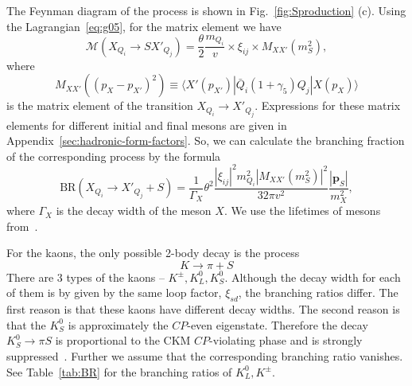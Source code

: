 \documentclass[a4paper,12pt,dvipsnames,usernames]{article}
\begin{document}
The Feynman diagram of the process is shown in Fig.~\ref{fig:Sproduction} (c). Using the Lagrangian~\eqref{eq:g05}, for the matrix element we have
\begin{equation}
    \mathcal{M} (X_{Q_{i}} \to S X'_{Q_{j}}) =
\frac{\theta}{2}\frac{m_{Q_{i}}}{v}\times  \xi_{ij}\times M_{XX'}(m_{S}^{2}),
    \label{eq:matrixelementhhS}
\end{equation} 
where
\begin{equation}
    M_{XX'}((p_{X}-p_{X'})^{2}) \equiv \langle X'(p_{X'})|\bar{Q}_{i}(1+\gamma_{5})Q_{j}|X(p_{X})\rangle
    \label{eq:hadronic-matrix-element-1}
\end{equation}
is the matrix element of the transition $X_{Q_{i}}\to X'_{Q_{j}}$. Expressions for these matrix elements for different initial and final mesons are given in Appendix~\ref{sec:hadronic-form-factors}. So, we can calculate the branching fraction of the corresponding process by the formula ~\cite{Tanabashi:2018oca}
\begin{equation}
    \text{BR}(X_{Q_{i}}\to X'_{Q_{j}}+S) = \frac{1}{\Gamma_{X}}\theta^{2}\frac{|\xi_{ij}|^{2}m_{Q_{i}}^{2}|M_{XX'}(m_{S}^{2})|^{2}}{32\pi v^{2}}\frac{|\bm{p}_{S}|}{m_{X}^{2}},
    \label{eq:productionBRmesons}
\end{equation}
where $\Gamma_{X}$ is the decay width of the meson $X$. We use the lifetimes of mesons from~\cite{Tanabashi:2018oca}.

For the kaons, the only possible 2-body decay is the process
\begin{equation}
    K \to \pi +S
\end{equation}
There are 3 types of the kaons -- $K^{\pm}, K^{0}_{L}, K^{0}_{S}$. Although the decay width for each of them is by given by the same loop factor, $\xi_{sd}$, the branching ratios differ. The first reason is that these kaons have different decay widths. The second reason is that the $K^{0}_{S}$ is approximately the $CP$-even eigenstate. Therefore the decay $K^{0}_{S}\to \pi S$ is proportional to the CKM $CP$-violating phase and is strongly suppressed~\cite{Leutwyler:1989xj}. Further we assume that the corresponding branching ratio vanishes. See Table~\ref{tab:BR} for the branching ratios of $K^{0}_{L},K^{\pm}$.
\end{document}
